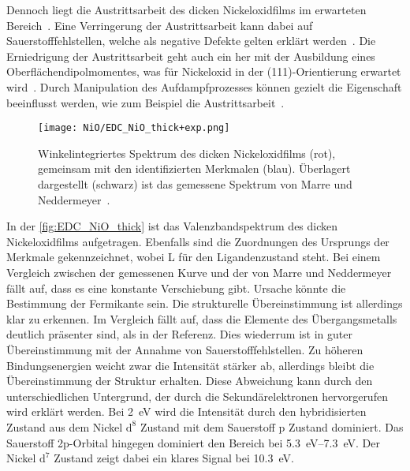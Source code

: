         Dennoch liegt die Austrittsarbeit des dicken Nickeloxidfilms im erwarteten Bereich~\cite{poulain_electronic_2020}.
        Eine Verringerung der Austrittsarbeit kann dabei auf Sauerstofffehlstellen, welche als negative Defekte gelten erklärt werden~\cite{IF_3}.
        Die Erniedrigung der Austrittsarbeit geht auch ein her mit der Ausbildung eines Oberflächendipolmomentes, was für Nickeloxid in der (111)-Orientierung erwartet wird~\cite{5A_5}.
        Durch Manipulation des Aufdampfprozesses können gezielt die Eigenschaft beeinflusst werden, wie zum Beispiel die Austrittsarbeit~\cite{poulain_electronic_2020}.

        \begin{figure}
            \centering
            \texttt{[image: NiO/EDC\_NiO\_thick+exp.png]}
            \caption{Winkelintegriertes Spektrum des dicken Nickeloxidfilms (rot), gemeinsam mit den identifizierten Merkmalen (blau).
            Überlagert dargestellt (schwarz) ist das gemessene Spektrum von Marre und Neddermeyer~\cite{NiO_7}.} 
            \label{fig:EDC_NiO_thick}
        \end{figure}
        In der \autoref{fig:EDC_NiO_thick} ist das Valenzbandspektrum des dicken Nickeloxidfilms aufgetragen.
        Ebenfalls sind die Zuordnungen des Ursprungs der Merkmale gekennzeichnet, wobei L für den Ligandenzustand steht.
        Bei einem Vergleich zwischen der gemessenen Kurve und der von Marre und Neddermeyer~\cite{NiO_7} fällt auf, dass es eine konstante Verschiebung gibt.
        Ursache könnte die Bestimmung der Fermikante sein. %
        Die strukturelle Übereinstimmung ist allerdings klar zu erkennen. 
        Im Vergleich fällt auf, dass die Elemente des Übergangsmetalls deutlich präsenter sind, als in der Referenz.
        Dies wiederrum ist in guter Übereinstimmung mit der Annahme von Sauerstofffehlstellen.
        Zu höheren Bindungsenergien weicht zwar die Intensität stärker ab, allerdings bleibt die Übereinstimmung der Struktur erhalten.
        Diese Abweichung kann durch den unterschiedlichen Untergrund, der durch die Sekundärelektronen hervorgerufen wird erklärt werden.
        Bei \SI{2}{\electronvolt} wird die Intensität durch den hybridisierten Zustand aus dem Nickel $\text{d}^8$ Zustand mit dem Sauerstoff p Zustand dominiert.
        Das Sauerstoff 2p-Orbital hingegen dominiert den Bereich bei \SIrange[range-phrase=\:und\:]{5.3}{7.3}{\electronvolt}.
        Der Nickel $\text{d}^7$ Zustand zeigt dabei ein klares Signal bei \SI{10.3}{\electronvolt}.

